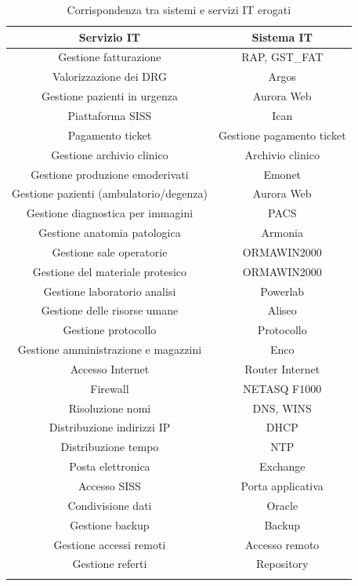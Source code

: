 \documentclass[12pt, a4paper, titlepage]{report}
\begin{document}
		\begin{longtable}{| c | c |}
				\hline
				\textbf{Servizio IT} & \textbf{Sistema IT} \\ \hline
				Gestione fatturazione & RAP, GST\_FAT \\ \hline
				Valorizzazione dei DRG & Argos \\ \hline
				Gestione pazienti in urgenza & Aurora Web\\ \hline
				Piattaforma SISS & Ican \\ \hline
				Pagamento ticket & Gestione pagamento ticket \\ \hline
				Gestione archivio clinico & Archivio clinico \\ \hline
				Gestione produzione emoderivati & Emonet \\ \hline
				Gestione pazienti (ambulatorio/degenza) & Aurora Web \\ \hline
				Gestione diagnostica per immagini & PACS \\ \hline
				Gestione anatomia patologica & Armonia \\ \hline
				Gestione sale operatorie & ORMAWIN2000 \\ \hline
				Gestione del materiale protesico & ORMAWIN2000\\ \hline
				Gestione laboratorio analisi & Powerlab \\ \hline
				Gestione delle risorse umane & Aliseo \\ \hline
				Gestione protocollo & Protocollo \\ \hline
				Gestione amministrazione e magazzini & Enco \\ \hline
				Accesso Internet & Router Internet \\ \hline
				Firewall & NETASQ F1000 \\ \hline
				Risoluzione nomi & DNS, WINS \\ \hline
				Distribuzione indirizzi IP & DHCP \\ \hline
				Distribuzione tempo & NTP \\ \hline
				Posta elettronica & Exchange \\ \hline
				Accesso SISS & Porta applicativa \\ \hline
				Condivisione dati & Oracle \\ \hline
				Gestione backup & Backup \\ \hline
				Gestione accessi remoti & Accesso remoto\\ \hline
				Gestione referti & Repository\\ \hline
				\caption{Corrispondenza tra sistemi e servizi IT erogati}
		\end{longtable}
		
\end{document}
